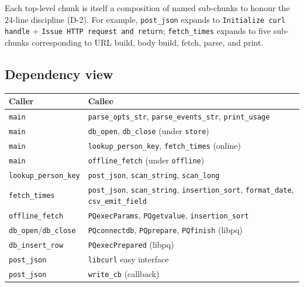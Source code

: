 \documentclass[12pt]{article}
\newcommand{\code}[1]{\texttt{#1}}
\begin{document}
\begin{description}[style=nextline]
Each top-level chunk is itself a composition of named sub-chunks
to honour the 24-line discipline (D-2).  For example,
\code{post\_json} expands to \code{Initialize curl handle} +
\code{Issue HTTP request and return}; \code{fetch\_times} expands
to five sub-chunks corresponding to URL build, body build, fetch,
parse, and print.

\subsection{Dependency view}

\begin{center}
\begin{tabular}{ll}
  \toprule
  \textbf{Caller}       & \textbf{Callee}                              \\
  \midrule
  \code{main}           & \code{parse\_opts\_str}, \code{parse\_events\_str}, \code{print\_usage} \\
  \code{main}           & \code{db\_open}, \code{db\_close} (under \code{store}) \\
  \code{main}           & \code{lookup\_person\_key}, \code{fetch\_times} (online) \\
  \code{main}           & \code{offline\_fetch} (under \code{offline})            \\
  \code{lookup\_person\_key} & \code{post\_json}, \code{scan\_string}, \code{scan\_long} \\
  \code{fetch\_times}   & \code{post\_json}, \code{scan\_string},
                          \code{insertion\_sort}, \code{format\_date},
                          \code{csv\_emit\_field}                        \\
  \code{offline\_fetch} & \code{PQexecParams}, \code{PQgetvalue},
                          \code{insertion\_sort}                          \\
  \code{db\_open}/\code{db\_close} & \code{PQconnectdb}, \code{PQprepare},
                          \code{PQfinish} (libpq)                         \\
  \code{db\_insert\_row} & \code{PQexecPrepared} (libpq)                  \\
  \code{post\_json}     & \code{libcurl} easy interface                  \\
  \code{post\_json}     & \code{write\_cb} (callback)                    \\
  \bottomrule
\end{tabular}
\end{center}


\end{description}
\end{document}
